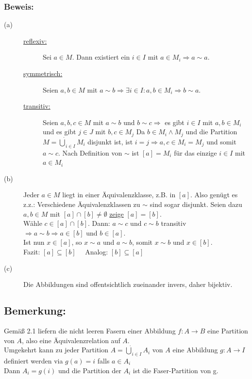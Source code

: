 \subsubsection{Beweis:}
\begin{description}
	\item[(a)] \quad
	\begin{description}
		\item[\underline{reflexiv:}] Sei $a \in M$. Dann existiert ein $i \in I$ mit $a \in M_{i} \Rightarrow a \sim a$.
		\item[\underline{symmetrisch:}] Seien $a,b \in M$ mit $a \sim b \Rightarrow \exists i \in I: a,b \in M_{i} \Rightarrow b \sim a$.
		\item[\underline{transitiv:}] Seien $a,b,c \in M$ mit $a \sim b$ und $b \sim c \Rightarrow$ es gibt $i \in I$ mit 
			$a,b \in M_{i}$ und es gibt $j\in J$ mit $b,c \in M_{j}$ Da $b \in M_{i} \wedge M_{j}$ und die Partition $M 
			= \dot{\bigcup}_{i \in I} M_{i}$ disjunkt ist, ist $i = j \Rightarrow a,c \in M_{i} = M_{j}$ und somit $a \sim 
			c$. Nach Definition von $\sim$ ist $[a] = M_{i}$ für das einzige $i \in I$ mit $a \in M_{i}$
	\end{description}
	\item[(b)] Jeder $a \in M$ liegt in einer Äquivalenzklasse, z.B. in $[a]$. Also genügt es z.z.: Verschiedene 	
		Äquivalenzklassen zu $\sim$ sind sogar disjunkt. Seien dazu $a,b \in M$ mit $[a] \cap [b] \neq \emptyset$ 
		\underline{zeige} $[a] = [b]$. \\
		Wähle $c \in [a] \cap [b]$. Dann: $a \sim c$ und $c \sim b$ transitiv $\Rightarrow a \sim b \Rightarrow a \in [b]$ 
		und $b \in [a]$. \\
		Ist nun $x \in [a]$, so $x \sim a$ und $a \sim b$, somit $x \sim b$ und $x \in [b]$. \\ 
		Fazit: $[a] \subseteq [b]$ \ \ Analog: $[b] \subseteq [a]$
	\item[(c)] Die Abbildungen sind offentsichtlich zueinander invers, daher bijektiv.
\end{description}
%
%
%
\subsection{Bemerkung:}
Gemäß 2.1 liefern die nicht leeren Fasern einer Abbildung $f: A \rightarrow B$ eine Partition von $A$, also eine Äquivalenzrelation auf $A$.\\
Umgekehrt kann zu jeder Partition $A =  \dot{\bigcup}_{i \in I} A_{i}$ von $A$ eine Abbildung $g: A \rightarrow I$ definiert werden via $g(a) = i$ falls $a \in A_{i}$\\
Dann $A_{i} = g(i)$ und die Partition der $A_{i}$ ist die Faser-Partition von g.